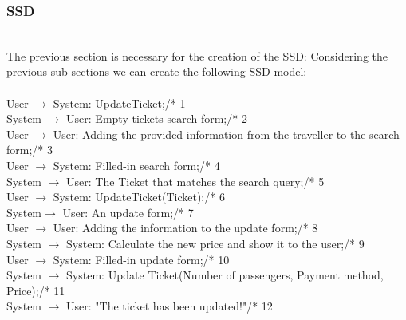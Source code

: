 \subsubsection{SSD}
\creator{\studentB}
\updater{\studentC}
\secondUpdater{\studentA}
\\
The previous section is necessary for the creation of the SSD:
Considering the previous sub-sections we can create the following SSD model:\\\\
User $\rightarrow$ System: UpdateTicket;\hfill /* 1\\
System $\rightarrow$ User: Empty tickets search form;\hfill /* 2\\
User $\rightarrow$ User: Adding the provided information from the traveller to the search form;\hfill /* 3\\
User $\rightarrow$ System: Filled-in search form;\hfill /* 4\\
System $\rightarrow$ User: The Ticket that matches the search query;\hfill /* 5\\
User $\rightarrow$ System: UpdateTicket(Ticket);\hfill /* 6\\
System$\rightarrow$ User: An update form;\hfill /* 7\\
User $\rightarrow$ User: Adding the information to the update form;\hfill /* 8\\
System $\rightarrow$ System: Calculate the new price and show it to the user;\hfill /* 9\\
User $\rightarrow$ System: Filled-in update form;\hfill /* 10\\
System $\rightarrow$ System: Update Ticket(Number of passengers, Payment method, Price);\hfill /* 11\\
System $\rightarrow$ User: "The ticket has been updated!"\hfill /* 12\\

\newpage

